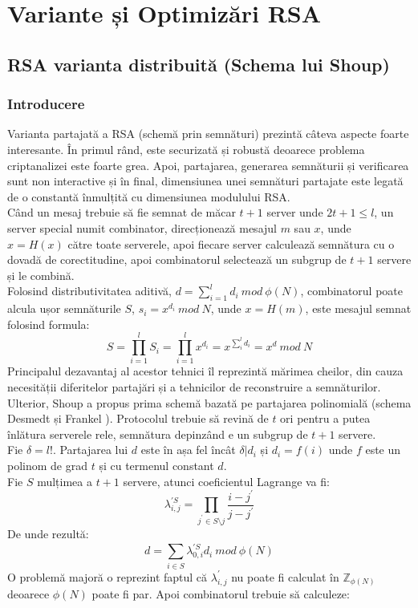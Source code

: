 \documentclass[12]{report}
\begin{document}
\chapter{Variante și Optimizări RSA}
\section{RSA varianta distribuită (Schema lui Shoup)}
\subsection{Introducere}
Varianta partajată a RSA (schemă prin semnături) prezintă câteva aspecte foarte interesante. În primul rând, este securizată și robustă deoarece problema criptanalizei este foarte grea. Apoi, partajarea, generarea semnăturii și verificarea sunt non interactive și în final, dimensiunea unei semnături partajate este legată de o constantă înmulțită cu dimensiunea modulului RSA. \\
Când un mesaj trebuie să fie semnat de măcar $ t+1 $ server unde $ 2t+1 \leq l $, un server special numit combinator, direcționează mesajul $m$ sau $x$, unde $x=H(x)$ către toate serverele, apoi fiecare server calculează semnătura cu o dovadă de corectitudine, apoi combinatorul selectează un subgrup de $t+1$ servere și le combină. \\
Folosind distributivitatea aditivă, $d=\sum_{i=1}^{l} d_i \ mod \ \phi(N)$, combinatorul poate alcula ușor semnăturile $S$, $s_i=x^{d_i} \ mod \ N$, unde $x=H(m)$, este mesajul semnat folosind formula:
$$ S= \prod_{i=1}^{l} S_i = \prod_{i=1}^{l} x^{d_i} = x^{\sum_{i}^{l} d_i} = x^d \ mod \ N $$
Principalul dezavantaj al acestor tehnici îl reprezintă mărimea cheilor, din cauza necesității diferitelor partajări și a tehnicilor de reconstruire a semnăturilor. Ulterior, Shoup a propus prima schemă bazată pe partajarea polinomială (schema Desmedt și Frankel \cite{desmet}). Protocolul trebuie să revină de $t$ ori pentru a putea înlătura serverele rele, semnătura depinzând e un subgrup de $t+1$ servere. \\
Fie $\delta =l!$. Partajarea lui $d$ este în așa fel încât $\delta | d_i$ și $d_i =f(i)$ unde $f$ este un polinom de grad $t$ și cu termenul constant $d$. \\
Fie $S$ mulțimea a $t+1$ servere, atunci coeficientul Lagrange va fi: 
$$ \lambda_{i,j}^{'S} = \prod_{j^{'} \in S \setminus j}^{} \frac{i-j^{'}}{j-j^{'}}   $$
De unde rezultă:
$$ d= \sum_{i \in S}^{} \lambda_{0,i}^{'S} d_i \ mod \ \phi(N)$$
O problemă majoră o reprezint faptul că $\lambda_{i,j}^{'}$ nu poate fi calculat în $\mathbb{Z}_{\phi(N)}$ deoarece $\phi(N)$ poate fi par. Apoi combinatorul trebuie să calculeze:
\end{document}
